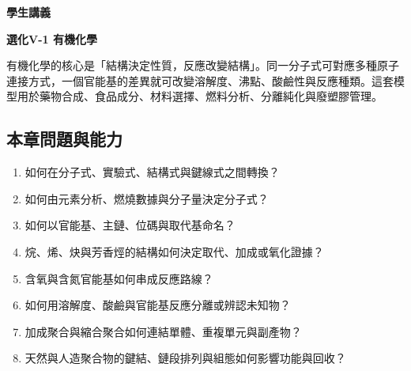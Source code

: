 \documentclass[11pt,a4paper]{article}
\providecommand{\tightlist}{%
  \setlength{\itemsep}{0pt}\setlength{\parskip}{0pt}}
\begin{document}
\begin{tcolorbox}[
  enhanced,colback=white,colframe=HandoutBlue,boxrule=1.1pt,arc=2mm,
  borderline west={3pt}{0pt}{HandoutBlue},left=5mm,right=4mm,top=4mm,bottom=4mm
]
{\sffamily\small\bfseries\color{HandoutBlue}學生講義}\par
{\sffamily\bfseries\LARGE\color{HandoutInk}選化V-1 有機化學}\par
\vspace{0.35em}{\large 由分子結構、官能基與反應證據，預測有機物的性質、轉換與高分子用途}\par
{}\par
{}\par
\end{tcolorbox}


有機化學的核心是「結構決定性質，反應改變結構」。同一分子式可對應多種原子連接方式，一個官能基的差異就可改變溶解度、沸點、酸鹼性與反應種類。這套模型用於藥物合成、食品成分、材料選擇、燃料分析、分離純化與廢塑膠管理。

\begin{HandoutLearningMap}

\subsection{本章問題與能力}\label{ux672cux7ae0ux554fux984cux8207ux80fdux529b}

\begin{enumerate}
\def\labelenumi{\arabic{enumi}.}
\tightlist
\item
  如何在分子式、實驗式、結構式與鍵線式之間轉換？
\item
  如何由元素分析、燃燒數據與分子量決定分子式？
\item
  如何以官能基、主鏈、位碼與取代基命名？
\item
  烷、烯、炔與芳香烴的結構如何決定取代、加成或氧化證據？
\item
  含氧與含氮官能基如何串成反應路線？
\item
  如何用溶解度、酸鹼與官能基反應分離或辨認未知物？
\item
  加成聚合與縮合聚合如何連結單體、重複單元與副產物？
\item
  天然與人造聚合物的鍵結、鏈段排列與組態如何影響功能與回收？
\end{enumerate}

\end{HandoutLearningMap}
\end{document}
